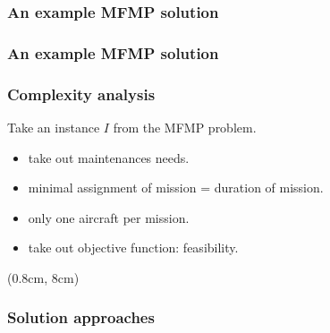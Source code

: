 \begin{frame}[t]
\frametitle{\textbf{An example MFMP solution}}
  
\end{frame}

\begin{frame}[t]
\frametitle{\textbf{An example MFMP solution}}
  
\end{frame}

\begin{frame}
\frametitle{\textbf{Complexity analysis}}
  
  Take an instance $I$ from the MFMP problem.
  \pause
  \begin{itemize}[<+->]
    \item take out maintenances needs.
    \item minimal assignment of mission = duration of mission.
    \item only one aircraft per mission.
    \item take out objective function: feasibility.
  \end{itemize}

  \begin{textblock*}{1.1\textwidth}(0.8cm, 8cm)
    \begin{flushleft}
    \end{flushleft}
  \end{textblock*}
\end{frame}

\begin{frame}
\frametitle{\textbf{Solution approaches}}
  \begin{block}{\textbf{\firsttitleF}}
  \end{block}  


\end{frame}


